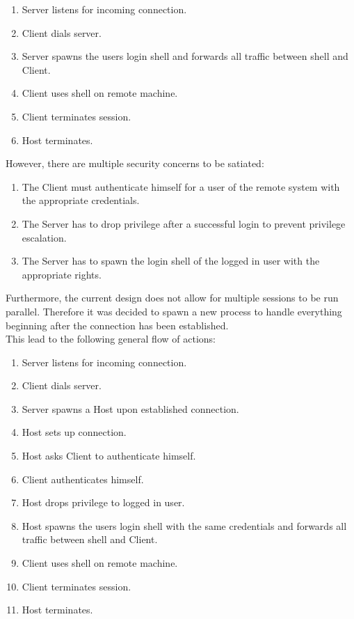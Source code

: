 \documentclass[10pt,a4paper,titlepage,twoside,english,final]{zhawreprt}
\begin{document}
\begin{enumerate}
\item Server listens for incoming connection.
\item Client dials server.
\item Server spawns the users login shell and forwards all traffic between shell and Client.
\item Client uses shell on remote machine.
\item Client terminates session.
\item Host terminates.
\end{enumerate}

However, there are multiple security concerns to be satiated:

\begin{enumerate}
\item The Client must authenticate himself for a user of the remote system with the appropriate credentials.
\item The Server has to drop privilege after a successful login to prevent privilege escalation.
\item The Server has to spawn the login shell of the logged in user with the appropriate rights.
\end{enumerate}

Furthermore, the current design does not allow for multiple sessions to be run parallel. Therefore it was decided to spawn a new process to handle everything beginning after the connection has been established.\\
This lead to  the following general flow of actions:

\begin{enumerate}
\item Server listens for incoming connection.
\item Client dials server.
\item Server spawns a Host upon established connection.
\item Host sets up connection.
\item Host asks Client to authenticate himself.
\item Client authenticates himself.
\item Host drops privilege to logged in user.
\item Host spawns the users login shell with the same credentials and forwards all traffic between shell and Client.
\item Client uses shell on remote machine.
\item Client terminates session.
\item Host terminates.
\end{enumerate}
\end{document}
